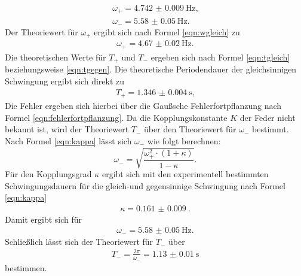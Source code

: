 \begin{gather*}
	\omega_{\mathrm{+}}= \SI{4.742(9)}{\Hz} \text{,}\\
	\omega_{\mathrm{-}}= \SI{5.58(5)}{\Hz} \text{.}
\end{gather*}
Der Theoriewert für $\omega_{\mathrm{+}}$ ergibt sich nach Formel \eqref{eqn:wgleich} zu
\begin{align*}
	\omega_{\mathrm{+}}= \SI{4.67(2)}{\Hz} \text{.}
\end{align*}
Die theoretischen Werte für $T_{\mathrm{+}}$ und $T_{\mathrm{-}}$ ergeben sich nach Formel \eqref{eqn:tgleich} beziehungsweise \eqref{eqn:tgegen}.
Die theoretische Periodendauer der gleichsinnigen Schwingung ergibt sich direkt zu
\begin{gather*}
	T_{\mathrm{+}}=\SI{1.346(4)}{\second} \text{,}
\end{gather*}
Die Fehler ergeben sich hierbei über die Gaußsche Fehlerfortpflanzung nach Formel \eqref{eqn:fehlerfortpflanzung}.
Da die Kopplungskonstante $K$ der Feder nicht bekannt ist, wird der Theoriewert $T_{\mathrm{-}}$ über den Theoriewert für $\omega_{\mathrm{-}}$ bestimmt.
Nach Formel \eqref{eqn:kappa} lässt sich $\omega_{\mathrm{-}}$ wie folgt berechnen:
\begin{equation}
	\label{eqn:omegaminus}
	\omega_{\mathrm{-}}=\sqrt{\frac{\omega_{\mathrm{+}}^2 \cdot(1+\kappa)}{1-\kappa}} \text{.}
\end{equation}
Für den Kopplungsgrad $\kappa$ ergibt sich mit den experimentell bestimmten Schwingungsdauern für die gleich-und gegensinnige Schwingung nach Formel \eqref{eqn:kappa}
\begin{align*}
	\kappa=\SI{0.161(9)}{} \text{.}
\end{align*}
Damit ergibt sich für
\begin{align*}
	\omega_{\mathrm{-}}=\SI{5.58(5)}{\Hz} \text{.}
\end{align*}
Schließlich lässt sich der Theoriewert für $T_{\mathrm{-}}$ über
\begin{align*}
	T_{\mathrm{-}}=\frac{2\pi}{\omega_{\mathrm{-}}}=\SI{1.13(1)}{\second}
\end{align*}
bestimmen.

